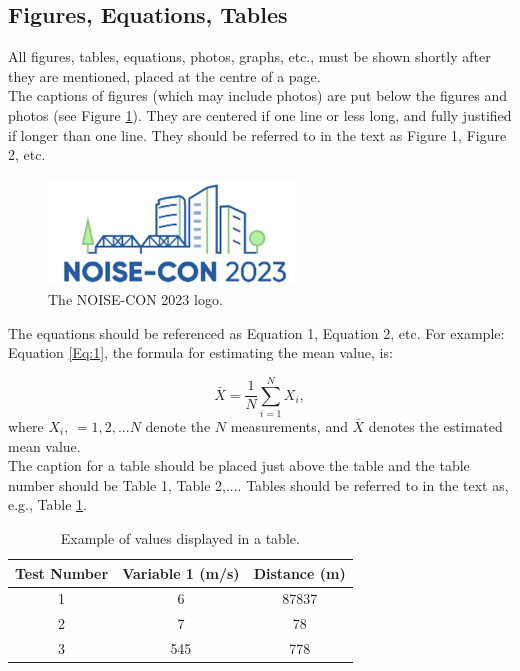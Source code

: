 \documentclass[letterpaper,12pt]{article}
\begin{document}
\subsection{Figures, Equations, Tables}
\noindent
All figures, tables, equations, photos, graphs, etc., must be shown shortly after they are mentioned, placed at the centre of a page.  \\

The captions of figures (which may include photos) are put below the figures and photos (see Figure \ref{fig:1}).  They are centered if one line or less long, and fully justified if longer than one line.  They should be referred to in the text as Figure 1, Figure 2, etc. 
\begin{figure}[h!]
\begin{center}
  \includegraphics[width=2.65in]{logo_NC23.jpg}
  \end{center}
  \caption{The NOISE-CON 2023 logo.}
  \label{fig:1}
\end{figure}

The equations should be referenced as Equation 1, Equation 2, etc. For example:  Equation \ref{Eq:1}, the formula for estimating the mean value, is:

\begin{equation}
\bar{X} = \frac{1}{N} \sum_{i=1}^{N} X_i ,
\label{Eq:1}
\end{equation}
\noindent
where $X_i$, $=1,2,...N$ denote the $N$ measurements, and $\bar{X}$ denotes the estimated mean value. 
\\

The caption for a table should be placed just above the table and the table number should be Table 1, Table 2,.... Tables should be referred to in the text as, e.g., Table \ref{Tab:1}.

\begin{table}[h!]

\caption{Example of values displayed in a table.}
\label{Tab:1}

\begin{center}
\begin{tabular}{c c c } 
 \hline
 \textbf{Test Number} &  \textbf{Variable 1 (m/s)}& \textbf{Distance (m)}  \\ [0.5ex] 
 \hline
 1 & 6 & 87837 \\ 
 \hline
 2 & 7 & 78  \\
 \hline
 3 & 545 & 778 \\ [1ex] 
 \hline
\end{tabular}
\end{center}
\end{table}
\end{document}
